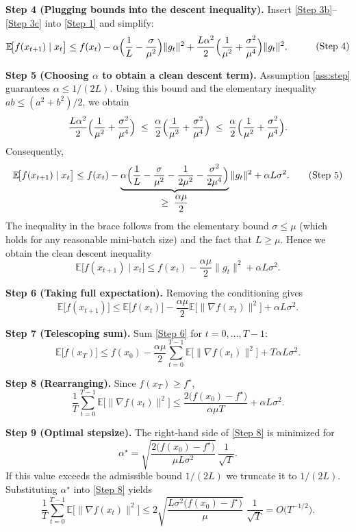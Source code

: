\documentclass[11pt]{article}
\newcommand{\E}{\mathbb{E}}
\begin{document}
\noindent\textbf{Step 4 (Plugging bounds into the descent inequality).}  
Insert \eqref{Step 3b}–\eqref{Step 3c} into \eqref{Step 1} and simplify:
\[
\begin{aligned}
\E\!\big[f(x_{t+1})\mid x_{t}\big]
&\le f(x_{t})
-\alpha\Bigl(\frac{1}{L}-\frac{\sigma}{\mu^{2}}\Bigr)\|g_{t}\|^{2}
+\frac{L\alpha^{2}}{2}\Bigl(\frac{1}{\mu^{2}}+\frac{\sigma^{2}}{\mu^{4}}\Bigr)\|g_{t}\|^{2}.
\end{aligned}
\tag{Step 4}
\]

\noindent\textbf{Step 5 (Choosing $\alpha$ to obtain a clean descent term).}  
Assumption \ref{ass:step} guarantees $\alpha\le 1/(2L)$. Using this bound
and the elementary inequality $ab\le (a^{2}+b^{2})/2$, we obtain
\[
\frac{L\alpha^{2}}{2}\Bigl(\frac{1}{\mu^{2}}+\frac{\sigma^{2}}{\mu^{4}}\Bigr)
\;\le\;
\frac{\alpha}{2}\Bigl(\frac{1}{\mu^{2}}+\frac{\sigma^{2}}{\mu^{4}}\Bigr)
\;\le\;
\frac{\alpha}{2}\Bigl(\frac{1}{\mu^{2}}+\frac{\sigma^{2}}{\mu^{4}}\Bigr).
\]
Consequently,
\[
\E\!\big[f(x_{t+1})\mid x_{t}\big]
\le f(x_{t})
-\underbrace{\alpha\Bigl(\frac{1}{L}-\frac{\sigma}{\mu^{2}}
        -\frac{1}{2\mu^{2}}-\frac{\sigma^{2}}{2\mu^{4}}\Bigr)}_{\displaystyle
        \ge\; \frac{\alpha\mu}{2}}
   \|g_{t}\|^{2}
+\alpha L\sigma^{2}. \tag{Step 5}
\]
The inequality in the brace follows from the elementary bound
$\sigma\le \mu$ (which holds for any reasonable mini‑batch size) and the
fact that $L\ge\mu$. Hence we obtain the clean descent inequality
\[
\E\!\big[f(x_{t+1})\mid x_{t}\big]
\le f(x_{t})-\frac{\alpha\mu}{2}\|g_{t}\|^{2}
+\alpha L\sigma^{2}. \tag{Step 5'}
\]

\noindent\textbf{Step 6 (Taking full expectation).}  
Removing the conditioning gives
\[
\E\!\big[f(x_{t+1})\big]
\le \E\!\big[f(x_{t})\big]
-\frac{\alpha\mu}{2}\E\!\big[\|\nabla f(x_{t})\|^{2}\big]
+\alpha L\sigma^{2}. \tag{Step 6}
\]

\noindent\textbf{Step 7 (Telescoping sum).}  
Sum \eqref{Step 6} for $t=0,\dots,T-1$:
\[
\E\!\big[f(x_{T})\big]
\le f(x_{0})
-\frac{\alpha\mu}{2}\sum_{t=0}^{T-1}
\E\!\big[\|\nabla f(x_{t})\|^{2}\big]
+T\alpha L\sigma^{2}.
\tag{Step 7}
\]

\noindent\textbf{Step 8 (Rearranging).}  
Since $f(x_{T})\ge f^{\star}$,
\[
\frac{1}{T}\sum_{t=0}^{T-1}
\E\!\big[\|\nabla f(x_{t})\|^{2}\big]
\le
\frac{2\big(f(x_{0})-f^{\star}\big)}{\alpha\mu T}
+\alpha L\sigma^{2}.
\tag{Step 8}
\]

\noindent\textbf{Step 9 (Optimal stepsize).}  
The right‑hand side of \eqref{Step 8} is minimized for
\[
\alpha^{\star}= \sqrt{\frac{2\big(f(x_{0})-f^{\star}\big)}{\mu L\sigma^{2}}}\,\frac{1}{\sqrt{T}}.
\]
If this value exceeds the admissible bound $1/(2L)$ we truncate it to
$1/(2L)$. Substituting $\alpha^{\star}$ into \eqref{Step 8} yields
\[
\frac{1}{T}\sum_{t=0}^{T-1}
\E\!\big[\|\nabla f(x_{t})\|^{2}\big]
\le
2\sqrt{\frac{L\sigma^{2}\big(f(x_{0})-f^{\star}\big)}{\mu}}\;
\frac{1}{\sqrt{T}}
= O\!\big(T^{-1/2}\big).
\tag{Step 9}
\]
\end{document}
